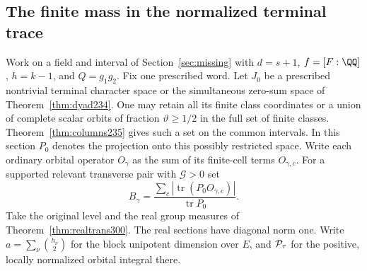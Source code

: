 \documentclass[a4paper,11pt]{article}
\theoremstyle{definition}
\theoremstyle{remark}
\numberwithin{equation}{section}
\begin{document}
\subsection{The finite mass in the normalized terminal trace}\label{nav:VI-57}
Work on a field and interval of Section~\ref{sec:missing} with \(d=s+1\),
\(f=[F:\QQ]\), \(h=k-1\), and \(Q=g_1g_2\). Fix one
prescribed word. Let \(J_0\) be a prescribed nontrivial
terminal character space or the simultaneous zero-sum space
of Theorem~\ref{thm:dyad234}. One may retain all its finite
class coordinates or a union of complete scalar orbits of
fraction \(\vartheta\ge1/2\) in the full set of finite classes.
Theorem~\ref{thm:columns235} gives such a set on the common
intervals. In this section \(P_0\) denotes the projection
onto this possibly restricted space. Write each ordinary
orbital operator \(O_\gamma\) as the sum of its finite-cell
terms \(O_{\gamma,c}\). For a supported relevant transverse
pair with \(\mathcal G>0\) set
\[
     B_\gamma=
       \frac{\sum_c|\operatorname{tr}(P_0 O_{\gamma,c})|}
            {\operatorname{tr} P_0}.
\]
Take the original level and the real group measures of
Theorem~\ref{thm:realtrans300}. The real sections have diagonal
norm one. Write \(a=\sum_\nu\binom{h_\nu}{2}\) for the block
unipotent dimension over \(E\), and \({\cal P}_\tau\) for the
positive, locally normalized orbital integral there.
\end{document}
